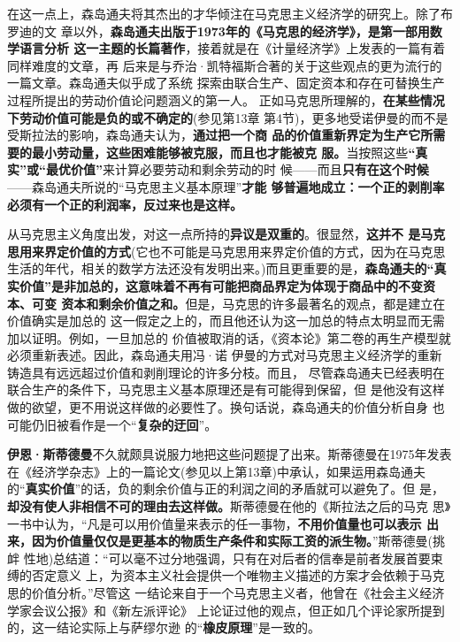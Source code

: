 在这一点上，森岛通夫将其杰出的才华倾注在马克思主义经济学的研究上。除了布罗迪的文
章以外，\textbf{森岛通夫出版于1973年的《马克思的经济学》，是第一部用数学语言分析
  这一主题的长篇著作}，接着就是在《计量经济学》上发表的一篇有着同样难度的文章，再
后来是与乔治·凯特福斯合著的关于这些观点的更为流行的一篇文章。森岛通夫似乎成了系统
探索由联合生产、固定资本和存在可替换生产过程所提出的劳动价值论问题涵义的第一人。
正如马克思所理解的，\textbf{在某些情况下劳动价值可能是负的或不确定的}(参见第13章
第4节)，更多地受诺伊曼的而不是受斯拉法的影响，森岛通夫认为，\textbf{通过把一个商
  品的价值重新界定为生产它所需要的最小劳动量，这些困难能够被克服，而且也才能被克
  服。}当按照这些\textbf{“真实”或“最优价值”}来计算必要劳动和剩余劳动的时
候——而且\textbf{只有在这个时候}——森岛通夫所说的“马克思主义基本原理”\textbf{才能
  够普遍地成立：一个正的剥削率必须有一个正的利润率，反过来也是这样。}

从马克思主义角度出发，对这一点所持的\textbf{异议是双重的}。很显然，\textbf{这并不
  是马克思用来界定价值的方式}(它也不可能是马克思用来界定价值的方式，因为在马克思
生活的年代，相关的数学方法还没有发明出来。)而且更重要的是，\textbf{森岛通夫的“真
  实价值”是非加总的，这意味着不再有可能把商品界定为体现于商品中的不变资本、可变
  资本和剩余价值之和。}但是，马克思的许多最著名的观点，都是建立在价值确实是加总的
这一假定之上的，而且他还认为这一加总的特点太明显而无需加以证明。例如，一旦加总的
价值被取消的话，《资本论》第二卷的再生产模型就必须重新表述。因此，森岛通夫用冯·诺
伊曼的方式对马克思主义经济学的重新铸造具有远远超过价值和剥削理论的许多分枝。而且，
尽管森岛通夫已经表明在联合生产的条件下，马克思主义基本原理还是有可能得到保留，但
是他没有这样做的欲望，更不用说这样做的必要性了。换句话说，森岛通夫的价值分析自身
也可能仍旧被看作是一个“\textbf{复杂的迂回}”。

\textbf{伊恩·斯蒂德曼}不久就颇具说服力地把这些问题提了出来。斯蒂德曼在1975年发表
在《经济学杂志》上的一篇论文(参见以上第13章)中承认，如果运用森岛通夫
的“\textbf{真实价值}”的话，负的剩余价值与正的利润之间的矛盾就可以避免了。但
是，\textbf{却没有使人非相信不可的理由去这样做。}斯蒂德曼在他的《斯拉法之后的马克
思》一书中认为，“凡是可以用价值量来表示的任一事物，\textbf{不用价值量也可以表示
  出来，因为价值量仅仅是更基本的物质生产条件和实际工资的派生物。}”斯蒂德曼(挑衅
性地)总结道：“可以毫不过分地强调，只有在对后者的信奉是前者发展首要束缚的否定意义
上，为资本主义社会提供一个唯物主义描述的方案才会依赖于马克思的价值分析。”尽管这
一结论来自于一个马克思主义者，他曾在《社会主义经济学家会议公报》和《新左派评论》
上论证过他的观点，但正如几个评论家所提到的，这一结论实际上与萨缪尔逊
的“\textbf{橡皮原理}”是一致的。

